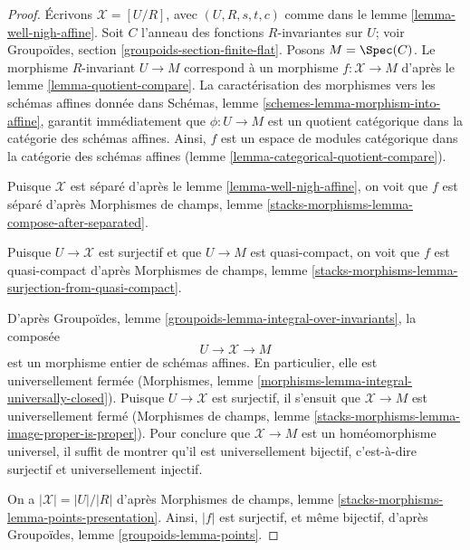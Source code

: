 \begin{proof}
Écrivons $\mathcal{X} = [U/R]$, avec $(U, R, s, t, c)$ comme dans le
lemme \ref{lemma-well-nigh-affine}. Soit $C$ l'anneau des
fonctions $R$-invariantes sur $U$; voir
Groupoïdes, section \ref{groupoids-section-finite-flat}.
Posons $M = \Spec(C)$. Le morphisme $R$-invariant
$U \to M$ correspond à un morphisme $f : \mathcal{X} \to M$ d'après le
lemme \ref{lemma-quotient-compare}.
La caractérisation des morphismes vers les schémas affines donnée dans
Schémas, lemme \ref{schemes-lemma-morphism-into-affine},
garantit immédiatement que $\phi : U \to M$ est un quotient
catégorique dans la catégorie des schémas affines. Ainsi, $f$ est un
espace de modules catégorique dans la catégorie des schémas affines
(lemme \ref{lemma-categorical-quotient-compare}).

\medskip\noindent
Puisque $\mathcal{X}$ est séparé d'après le lemme \ref{lemma-well-nigh-affine},
on voit que $f$ est séparé d'après Morphismes de champs, lemme
\ref{stacks-morphisms-lemma-compose-after-separated}.

\medskip\noindent
Puisque $U \to \mathcal{X}$ est surjectif et que $U \to M$ est quasi-compact,
on voit que $f$ est quasi-compact d'après Morphismes de champs, lemme
\ref{stacks-morphisms-lemma-surjection-from-quasi-compact}.

\medskip\noindent
D'après Groupoïdes, lemme \ref{groupoids-lemma-integral-over-invariants},
la composée
$$
U \to \mathcal{X} \to M
$$
est un morphisme entier de schémas affines. En particulier, elle est
universellement fermée
(Morphismes, lemme \ref{morphisms-lemma-integral-universally-closed}).
Puisque $U \to \mathcal{X}$ est surjectif, il s'ensuit que $\mathcal{X} \to M$
est universellement fermé (Morphismes de champs, lemme
\ref{stacks-morphisms-lemma-image-proper-is-proper}).
Pour conclure que $\mathcal{X} \to M$ est un homéomorphisme universel,
il suffit de montrer qu'il est universellement bijectif, c'est-à-dire
surjectif et universellement injectif.

\medskip\noindent
On a $|\mathcal{X}| = |U|/|R|$ d'après
Morphismes de champs, lemme \ref{stacks-morphisms-lemma-points-presentation}.
Ainsi, $|f|$ est surjectif, et même bijectif,
d'après Groupoïdes, lemme \ref{groupoids-lemma-points}.


\end{proof}

